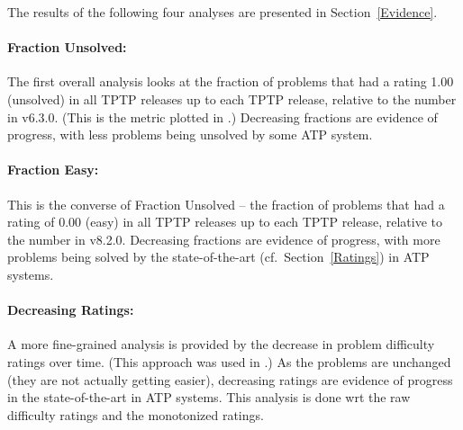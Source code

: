 \documentclass[runningheads]{llncs}
\begin{document}
\vspace*{1em}
\noindent
The results of the following four analyses are presented in Section~\ref{Evidence}.

\paragraph{Fraction Unsolved:}
The first overall analysis looks at the fraction of problems that had a rating 1.00 
(unsolved) in all TPTP releases up to each TPTP release, relative to the number in v6.3.0.
(This is the metric plotted in \cite{SSP21}.)
Decreasing fractions are evidence of progress, with less problems being unsolved by some ATP 
system.

\paragraph{Fraction Easy:}
This is the converse of Fraction Unsolved -- the fraction of problems that had a rating of 
0.00 (easy) in all TPTP releases up to each TPTP release, relative to the number in v8.2.0.
Decreasing fractions are evidence of progress, with more problems being solved by the 
state-of-the-art (cf.~Section~\ref{Ratings}) in ATP systems.

\paragraph{Decreasing Ratings:}
A more fine-grained analysis is provided by the decrease in problem difficulty ratings over
time. 
(This approach was used in \cite{SFS01}.)
As the problems are unchanged (they are not actually getting easier), decreasing ratings are 
evidence of progress in the state-of-the-art in ATP systems.
This analysis is done wrt the raw difficulty ratings and the monotonized ratings.
\end{document}
